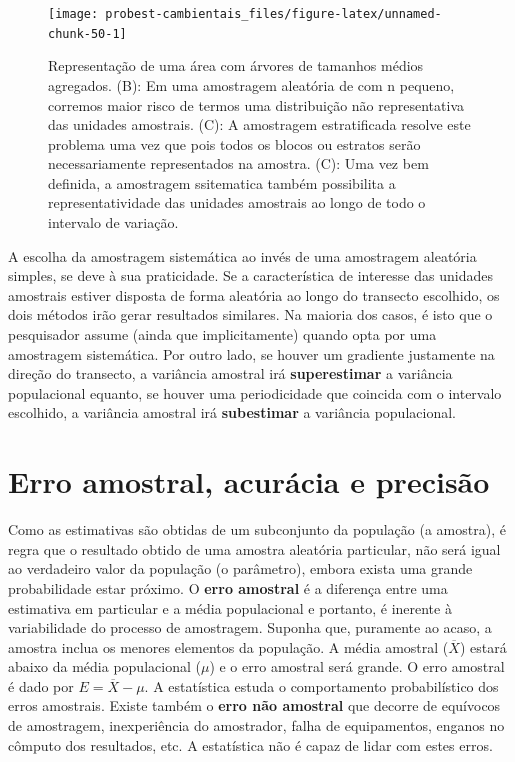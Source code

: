 \documentclass[
]{book}
\begin{document}
\begin{figure}

{\centering \texttt{[image: probest-cambientais\_files/figure-latex/unnamed-chunk-50-1]} 

}

\caption{Representação de uma área com árvores de tamanhos médios agregados. (B): Em uma amostragem aleatória de com n pequeno, corremos maior risco de termos uma distribuição não representativa das unidades amostrais. (C): A amostragem estratificada resolve este problema uma vez que pois todos os blocos ou estratos serão necessariamente representados na amostra. (C): Uma vez bem definida, a amostragem ssitematica também possibilita a representatividade das unidades amostrais ao longo de todo o intervalo de variação.}\label{fig:unnamed-chunk-50}
\end{figure}

A escolha da amostragem sistemática ao invés de uma amostragem aleatória simples, se deve à sua praticidade. Se a característica de interesse das unidades amostrais estiver disposta de forma aleatória ao longo do transecto escolhido, os dois métodos irão gerar resultados similares. Na maioria dos casos, é isto que o pesquisador assume (ainda que implicitamente) quando opta por uma amostragem sistemática. Por outro lado, se houver um gradiente justamente na direção do transecto, a variância amostral irá \textbf{superestimar} a variância populacional equanto, se houver uma periodicidade que coincida com o intervalo escolhido, a variância amostral irá \textbf{subestimar} a variância populacional.

\hypertarget{erro-amostral-acuruxe1cia-e-precisuxe3o}{%
\section{Erro amostral, acurácia e precisão}\label{erro-amostral-acuruxe1cia-e-precisuxe3o}}

Como as estimativas são obtidas de um subconjunto da população (a amostra), é regra que o resultado obtido de uma amostra aleatória particular, não será igual ao verdadeiro valor da população (o parâmetro), embora exista uma grande probabilidade estar próximo. O \textbf{erro amostral} é a diferença entre uma estimativa em particular e a média populacional e portanto, é inerente à variabilidade do processo de amostragem. Suponha que, puramente ao acaso, a amostra inclua os menores elementos da população. A média amostral (\(\overline{X}\)) estará abaixo da média populacional (\(\mu\)) e o erro amostral será grande. O erro amostral é dado por \(E = \overline{X} - \mu\). A estatística estuda o comportamento probabilístico dos erros amostrais. Existe também o \textbf{erro não amostral} que decorre de equívocos de amostragem, inexperiência do amostrador, falha de equipamentos, enganos no cômputo dos resultados, etc. A estatística não é capaz de lidar com estes erros.
\end{document}
